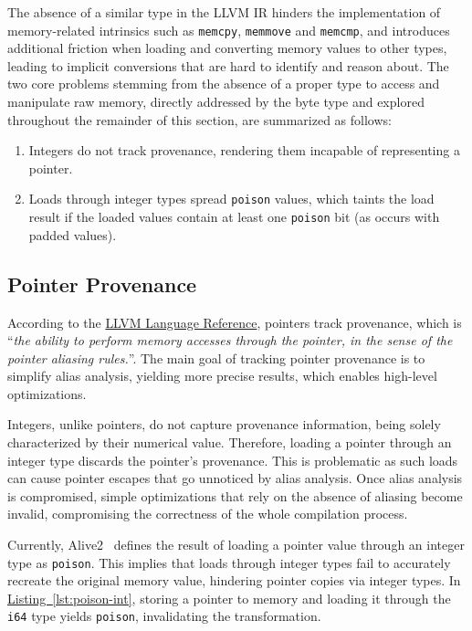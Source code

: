 \documentclass[a4paper,12pt]{article}
\begin{document}
The absence of a similar type in the LLVM IR hinders the implementation of memory-related intrinsics such as \texttt{memcpy}, \texttt{memmove} and \texttt{memcmp}, and introduces additional friction when loading and converting memory values to other types, leading to implicit conversions that are hard to identify and reason about.
The two core problems stemming from the absence of a proper type to access and manipulate raw memory, directly addressed by the byte type and explored throughout the remainder of this section, are summarized as follows:

\begin{enumerate}
  \item Integers do not track provenance, rendering them incapable of representing a pointer.
	\item Loads through integer types spread \texttt{poison} values, which taints the load result if the loaded values contain at least one \texttt{poison} bit (as occurs with padded values).
\end{enumerate}

\subsection{Pointer Provenance}

According to the \href{https://llvm.org/docs/LangRef.html}{LLVM Language Reference}, pointers track provenance, which is ``\textit{the ability to perform memory accesses through the pointer, in the sense of the pointer aliasing rules.}''.
The main goal of tracking pointer provenance is to simplify alias analysis, yielding more precise results, which enables high-level optimizations.

Integers, unlike pointers, do not capture provenance information, being solely characterized by their numerical value.
Therefore, loading a pointer through an integer type discards the pointer's provenance.
This is problematic as such loads can cause pointer escapes that go unnoticed by alias analysis.
Once alias analysis is compromised, simple optimizations that rely on the absence of aliasing become invalid, compromising the correctness of the whole compilation process.

Currently, Alive2~\cite{alive} defines the result of loading a pointer value through an integer type as \texttt{poison}.
This implies that loads through integer types fail to accurately recreate the original memory value, hindering pointer copies via integer types.
In \href{https://alive2.llvm.org/ce/z/VUTsdW}{Listing~\ref{lst:poison-int}}, storing a pointer to memory and loading it through the \texttt{i64} type yields \texttt{poison}, invalidating the transformation.
\end{document}
